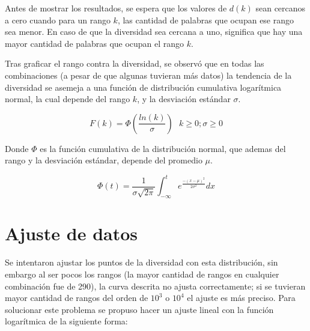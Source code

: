 Antes de mostrar los resultados, se espera  que los valores de $d(k)$ sean cercanos a cero cuando  para un rango $k$, las cantidad de palabras que ocupan ese rango sea menor. En caso de que la diversidad sea cercana a uno,  significa que hay una mayor cantidad de palabras que ocupan el rango $k$. 


Tras graficar el rango contra la diversidad, se observó que en todas las combinaciones (a pesar de que algunas tuvieran más datos)  la tendencia de la diversidad  se asemeja a una función de distribución cumulativa logarítmica  normal, la cual depende del rango $k$, y la desviación estándar $\sigma$.

\begin{equation}
	\label{ec.cumulativa}
	F(k) = \Phi \left ( \frac{ln(k)}{\sigma} \right )\,\,\,\,k\geq 0; \sigma \geq 0
\end{equation}

Donde $\Phi$ es la función cumulativa de la distribución normal, que ademas del rango y la desviación estándar, depende del promedio $\mu$.

\begin{equation}
	\label{ec.distribucionnormal}
	\Phi(t) = \frac{1}{\sigma\sqrt{2\pi}} \int_{-\infty}^{t}  e^{ \frac{ - \left ( x-\mu \right )^{2}}{2\sigma^2}  } dx	
\end{equation}



\section{Ajuste de datos}


Se intentaron ajustar los puntos de la diversidad con esta distribución, sin embargo al ser pocos los rangos (la mayor cantidad de rangos en cualquier combinación fue de 290),  la curva descrita  no ajusta correctamente;  si se tuvieran mayor cantidad de rangos del orden de $10^{3}$ o $10^{4}$ el ajuste es más preciso.  Para solucionar este problema se propuso hacer un ajuste lineal con la función logarítmica  de la siguiente forma:



